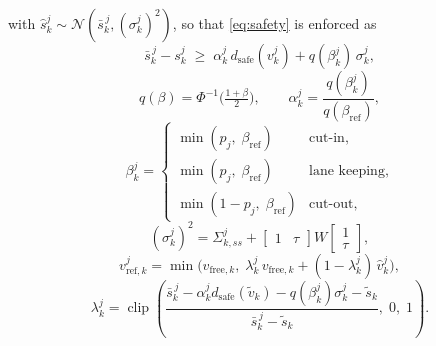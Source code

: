 \documentclass[letterpaper, 10 pt, journal]{IEEEtran}
\begin{document}
with $\hat s^j_k \sim \mathcal{N}(\bar s^{\,j}_k, (\sigma^j_k)^2)$, so that \eqref{eq:safety} is enforced as
\begin{equation}
    \bar s^{\,j}_k - s^j_k \;\ge\; \alpha^j_k\, d_{\mathrm{safe}}(v^j_k) + q(\beta^j_k)\,\sigma^j_k,
    \label{eq:safety_det}
\end{equation}
\begin{equation}
    q(\beta) = \Phi^{-1}\!\Big(\tfrac{1+\beta}{2}\Big), \qquad
    \alpha^j_k = \frac{q(\beta^j_k)}{q(\beta_{\mathrm{ref}})},
    \label{eq:alpha}
\end{equation}
\begin{equation}
    \beta^j_k =
    \begin{cases}
        \min(p_j,\; \beta_{\mathrm{ref}}) & \text{cut-in}, \\
        \min(p_j,\; \beta_{\mathrm{ref}}) & \text{lane keeping}, \\
        \min(1 - p_j,\; \beta_{\mathrm{ref}}) & \text{cut-out},
    \end{cases}
    \label{eq:beta}
\end{equation}
\begin{equation}
    (\sigma^j_k)^2 = \Sigma^{j}_{k,ss} + \begin{bmatrix} 1 & \tau \end{bmatrix}
    W \begin{bmatrix} 1 \\ \tau \end{bmatrix},
    \label{eq:sigma}
\end{equation}
\begin{equation}
    v^j_{\mathrm{ref},k} = \min\!\big(v_{\mathrm{free},k},\;
    \lambda^j_k\, v_{\mathrm{free},k} + (1-\lambda^j_k)\, \hat v^j_k\big),
    \label{eq:vref}
\end{equation}
\begin{equation}
    \lambda^j_k = \operatorname{clip}\!\left(
        \frac{\bar s^{\,j}_k - \alpha^j_k d_{\mathrm{safe}}(\tilde v_k) - q(\beta^j_k)\sigma^j_k - \tilde s_k}
             {\bar s^{\,j}_k - \tilde s_k},\; 0,\; 1\right).
    \label{eq:vref_blend}
\end{equation}
\end{document}
